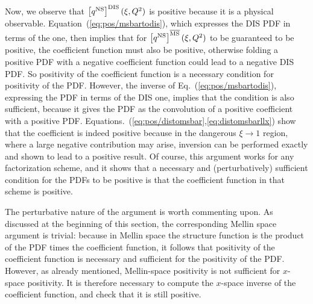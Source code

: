 Now, we observe that
$\left[{q^{{\textrm{NS}}}}\right]^{\textrm{DIS}}(\xi,Q^2)$ is positive because it is a physical
observable. Equation~(\ref{eq:pos/msbartodis}), which expresses the DIS
PDF in terms of the \msbar{} one, then  implies that  for
$\left[{q^{{\textrm{NS}}}}\right]^{{\overline{\textrm{MS}}}}(\xi,Q^2)$  to be guaranteed to be
positive,
the \msbar{} coefficient function  must also be positive, otherwise
folding a positive \msbar{}  PDF with a negative coefficient function
could lead to a negative DIS PDF. So positivity of the \msbar{}
coefficient function
is a necessary condition for positivity of the \msbar{} PDF.
However, the inverse of  Eq.~(\ref{eq:pos/msbartodis}), expressing the
\msbar{} PDF in terms of the DIS one, implies that the condition is
also sufficient, because it gives the \msbar{} PDF as the convolution
of a positive coefficient with a positive PDF. Equations.~(\ref{eq:pos/distomsbar},\ref{eq:distomsbarllx}) show that the coefficient is indeed
positive because in the dangerous
$\xi\to 1$ region, where  a large negative contribution may arise,
inversion can be performed exactly and shown to lead to a positive
result.
Of
course, this argument works for any factorization scheme, and it shows
that a necessary and (perturbatively) sufficient condition for the
PDFs to be positive is that the coefficient function in that scheme is positive.

The perturbative nature of the argument is worth commenting
upon. As discussed at the beginning of this section, the corresponding
Mellin space argument is trivial: because in Mellin space the
structure function is the product of the PDF times the coefficient
function, it follows that positivity of the coefficient function is
necessary and sufficient for the positivity of the PDF. However, as
already mentioned,
Mellin-space positivity is not sufficient for $x$-space positivity. It
is therefore necessary to compute the $x$-space inverse of the
coefficient function, and check that it is still positive.

